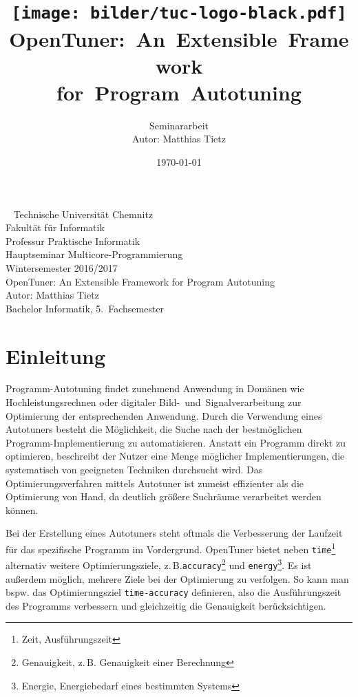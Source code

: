 \documentclass[a4paper,11pt]{scrartcl}
\title{\texttt{[image: bilder/tuc-logo-black.pdf]}
    OpenTuner:~An~Extensible~Framework\\for~Program~Autotuning
}
\author{Seminararbeit\\Autor: Matthias Tietz}
\date{\today}
\newcommand{\zB}{\mbox{z.\,B.}\xspace}
\begin{document}
\maketitle \thispagestyle{empty} \newpage

\thispagestyle{empty}
~
\vfill
\noindent %
Technische Universität Chemnitz\\
Fakultät für Informatik\\
Professur Praktische Informatik\\
Hauptseminar Multicore-Programmierung\\
Wintersemester 2016/2017\\

\noindent
OpenTuner: An Extensible Framework for Program Autotuning\\
Autor: Matthias Tietz\\
Bachelor Informatik, 5.~Fachsemester

\newpage
\tableofcontents \newpage



\section{Einleitung}

Programm-Autotuning findet zunehmend Anwendung in Domänen wie Hochleistungsrechnen oder
digitaler Bild-~und~Signalverarbeitung zur Optimierung der entsprechenden Anwendung.
Durch die Verwendung eines Autotuners besteht die Möglichkeit, die Suche nach der
bestmöglichen Programm-Implementierung zu automatisieren. Anstatt ein Programm direkt
zu optimieren, beschreibt der Nutzer eine Menge möglicher Implementierungen, die 
systematisch von geeigneten Techniken durchsucht wird. Das Optimierungsverfahren
mittels Autotuner ist zumeist effizienter als die Optimierung von Hand, da deutlich größere
Suchräume verarbeitet werden können. \newline

\noindent
Bei der Erstellung eines Autotuners steht oftmals die Verbesserung der Laufzeit
für das spezifische Programm im Vordergrund. OpenTuner bietet neben \texttt{time}\footnote{Zeit, Ausführungszeit}  
alternativ weitere Optimierungsziele, \zB \texttt{accuracy}\footnote{Genauigkeit, \zB Genauigkeit einer Berechnung}  
und \texttt{energy}\footnote{Energie, Energiebedarf eines bestimmten Systems}.
Es ist außerdem möglich, mehrere Ziele bei der Optimierung zu verfolgen. 
So kann man bspw. das Optimierungsziel \texttt{time-accuracy} definieren, also die Ausführungszeit
des Programms verbessern und gleichzeitig die Genauigkeit berücksichtigen. \newline
\end{document}
